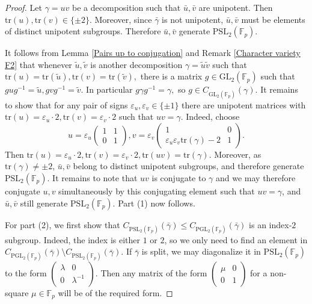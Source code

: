\documentclass[letterpaper]{amsart}
\begin{document}
\begin{proof}
Let $\gamma = uv$ be a decomposition such that $\bar{u}, \bar{v}$ are unipotent. Then $\mathrm{tr}(u),\mathrm{tr}(v)\in\{\pm 2\}$. Moreover, since $\bar{\gamma}$ is not unipotent, $\bar{u}, \bar{v}$ must be elements of distinct unipotent subgroups. Therefore $\bar{u}, \bar{v}$ generate $\mathrm{PSL}_2(\mathbb{F}_p).$

It follows from Lemma \ref{Pairs up to conjugation} and Remark \ref{Character variety F2} that whenever $\tilde{u},\tilde{v}$ is another decomposition $\gamma = \tilde{u}\tilde{v}$ such that $\mathrm{tr}(u) = \mathrm{tr}(\tilde{u}), \mathrm{tr}(v) = \mathrm{tr}(\tilde{v}),$ there is a matrix $g \in \mathrm{GL}_2(\mathbb{F}_p)$ such that $gug^{-1} = \tilde{u}, gvg^{-1} = \tilde{v}$. In particular $g \gamma g^{-1} = \gamma,$ so $g \in C_{\mathrm{GL}_2(\mathbb{F}_p)}(\gamma).$
It remains to show that for any pair of signs $\varepsilon_u, \varepsilon_v \in \{\pm 1\}$ there are unipotent matrices with $\mathrm{tr}(u) = \varepsilon_u \cdot 2, \mathrm{tr}(v) = \varepsilon_v \cdot 2$ such that $uv = \gamma$. Indeed, choose
$$u = \varepsilon_u\begin{pmatrix} 1 & 1 \\ 0 & 1\end{pmatrix}, v = \varepsilon_v\begin{pmatrix} 1 & 0 \\ \varepsilon_u\varepsilon_v\mathrm{tr}(\gamma) - 2 & 1 \end{pmatrix}.$$
Then $\mathrm{tr}(u) = \varepsilon_u \cdot 2, \mathrm{tr}(v) = \varepsilon_v \cdot 2, \mathrm{tr}(uv) = \mathrm{tr}(\gamma)$. Moreover, as $\mathrm{tr}(\gamma) \neq \pm 2$, $\bar{u}, \bar{v}$ belong to distinct unipotent subgroups, and therefore generate $\mathrm{PSL}_2(\mathbb{F}_p).$ It remains to note that $uv$ is conjugate to $\gamma$ and we may therefore conjugate $u, v$ simultaneously by this conjugating element such that $uv = \gamma$, and $\bar{u}, \bar{v}$ still generate $\mathrm{PSL}_2(\mathbb{F}_p).$ Part (1) now follows.

For part (2), we first show that $C_{\mathrm{PSL}_2(\mathbb{F}_p)}(\bar{\gamma}) \leq C_{\mathrm{PGL}_2(\mathbb{F}_p)}(\bar{\gamma})$ is an index-$2$ subgroup. Indeed, the index is either $1$ or $2$, so we only need to find an element in $C_{\mathrm{PGL}_2(\mathbb{F}_p)}(\bar{\gamma}) \setminus C_{\mathrm{PSL}_2(\mathbb{F}_p)}(\bar{\gamma}).$
If $\bar{\gamma}$ is split, we may diagonalize it in $\mathrm{PSL}_2(\mathbb{F}_p)$ to the form $\begin{pmatrix} \lambda & 0 \\ 0 & \lambda^{-1}\end{pmatrix}.$ Then any matrix of the form $\begin{pmatrix} \mu & 0 \\ 0 & 1\end{pmatrix}$ for a non-square $\mu \in \mathbb{F}_p$ will be of the required form.


\end{proof}
\end{document}
